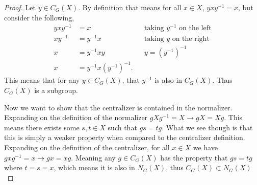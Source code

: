 \documentclass[10pt]{article}
\begin{document}
\begin{proof}
    Let $y \in C_G(X)$. By definition that means for all $x\in X$, $yxy^{-1} = x$, but consider the following,
    \begin{align*}
        yxy^{-1} &= x && \text{taking $y^{-1}$ on the left} \\
        xy^{-1} &= y^{-1}x && \text{taking $y$ on the right} \\
        x &= y^{-1}xy && y = (y^{-1})^{-1} \\
        x &= y^{-1}x(y^{-1})^{-1}.  
    \end{align*}
    This means that for any $y\in C_G(X)$, that $y^{-1}$ is also in $C_G(X)$. Thus $C_G(X)$ is a subgroup. 
    
    Now we want to show that the centralizer is contained in the normalizer. Expanding on the definition of the normalizer $gXg^{-1} = X \rightarrow gX = Xg$. This means there exists some $s,t\in X$ such that $gs = tg$. What we see though is that this is simply a weaker property when compared to the centralizer definition. Expanding on the definition of the centralizer, for all $x\in X$ we have $gxg^{-1} = x \rightarrow gx = xg$. Meaning any $g\in C_G(X)$ has the property that $gs = tg$ where $t = s = x$, which means it is also in $N_G(X)$, thus $C_G(X) \subset N_G(X)$
\end{proof}
\end{document}
